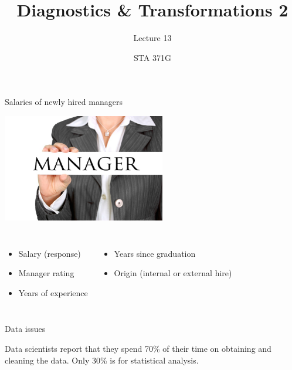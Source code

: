 \documentclass{beamer}\usepackage[]{graphicx}\usepackage[]{color}
\title{Diagnostics \& Transformations 2}
\subtitle{Lecture 13}
\author{STA 371G}
\begin{document}
  
  

  \frame{\maketitle}



  \begin{darkframes}
    
    
    \begin{frame}{Salaries of newly hired managers}
      \begin{center}
        \includegraphics[width=2.8in]{manager} \\
      \end{center} \pause
      
      \begin{columns}[onlytextwidth]
          \begin{itemize}
            \item Salary (response)
            \item Manager rating
            \item Years of experience
          \end{itemize}
          \begin{itemize}
            \item Years since graduation
            \item Origin (internal or external hire)
          \end{itemize}
      \end{columns}
    \end{frame}
   
    \begin{frame}[fragile]{Data issues}
      \begin{center}
        Data scientists report that they spend \alert{70\% of their time on obtaining and cleaning the data}. Only 30\% is for statistical analysis.\bigskip \pause
        

\end{center}
\end{frame}
\end{darkframes}
\end{document}
